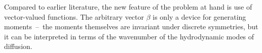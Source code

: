 Compared to earlier literature, the new feature of the
problem at hand is use of vector-valued functions. The arbitrary vector
$\beta$ is only a device for generating moments~--~the moments themselves
are invariant under discrete symmetries, but it can be interpreted in
terms of the wavenumber of the hydrodynamic modes of diffusion.

    \fi %
